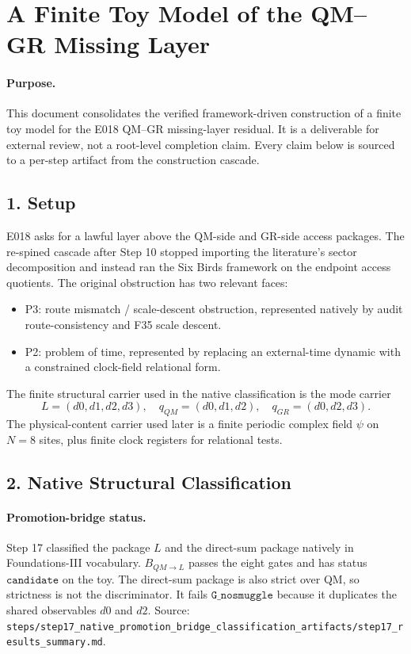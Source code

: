 \section*{A Finite Toy Model of the QM--GR Missing Layer}

\paragraph{Purpose.}
This document consolidates the verified framework-driven construction of a
finite toy model for the E018 QM--GR missing-layer residual.  It is a
deliverable for external review, not a root-level completion claim.  Every
claim below is sourced to a per-step artifact from the construction cascade.

\subsection*{1. Setup}

E018 asks for a lawful layer above the QM-side and GR-side access packages.
The re-spined cascade after Step 10 stopped importing the literature's sector
decomposition and instead ran the Six Birds framework on the endpoint access
quotients.  The original obstruction has two relevant faces:

\begin{itemize}
\item P3: route mismatch / scale-descent obstruction, represented natively by
  audit route-consistency and F35 scale descent.
\item P2: problem of time, represented by replacing an external-time dynamic
  with a constrained clock-field relational form.
\end{itemize}

The finite structural carrier used in the native classification is the mode
carrier
\[
L=(d0,d1,d2,d3),
\quad
q_{QM}=(d0,d1,d2),
\quad
q_{GR}=(d0,d2,d3).
\]
The physical-content carrier used later is a finite periodic complex field
\(\psi\) on \(N=8\) sites, plus finite clock registers for relational tests.

\subsection*{2. Native Structural Classification}

\paragraph{Promotion-bridge status.}
Step 17 classified the package \(L\) and the direct-sum package natively in
Foundations-III vocabulary.  \(B_{QM\to L}\) passes the eight gates and has
status \(\texttt{candidate}\) on the toy.  The direct-sum package is also
strict over QM, so strictness is not the discriminator.  It fails
\(\texttt{G\_nosmuggle}\) because it duplicates the shared observables \(d0\)
and \(d2\).  Source:
\texttt{steps/step17\_native\_promotion\_bridge\_classification\_artifacts/step17\_results\_summary.md}.

